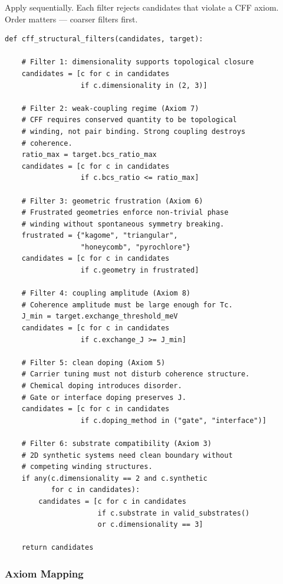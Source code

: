 \documentclass[11pt, a4paper]{article}
\begin{document}
Apply sequentially. Each filter rejects candidates that violate a
CFF axiom. Order matters --- coarser filters first.

\begin{lstlisting}
def cff_structural_filters(candidates, target):

    # Filter 1: dimensionality supports topological closure
    candidates = [c for c in candidates
                  if c.dimensionality in (2, 3)]

    # Filter 2: weak-coupling regime (Axiom 7)
    # CFF requires conserved quantity to be topological
    # winding, not pair binding. Strong coupling destroys
    # coherence.
    ratio_max = target.bcs_ratio_max
    candidates = [c for c in candidates
                  if c.bcs_ratio <= ratio_max]

    # Filter 3: geometric frustration (Axiom 6)
    # Frustrated geometries enforce non-trivial phase
    # winding without spontaneous symmetry breaking.
    frustrated = {"kagome", "triangular",
                  "honeycomb", "pyrochlore"}
    candidates = [c for c in candidates
                  if c.geometry in frustrated]

    # Filter 4: coupling amplitude (Axiom 8)
    # Coherence amplitude must be large enough for Tc.
    J_min = target.exchange_threshold_meV
    candidates = [c for c in candidates
                  if c.exchange_J >= J_min]

    # Filter 5: clean doping (Axiom 5)
    # Carrier tuning must not disturb coherence structure.
    # Chemical doping introduces disorder.
    # Gate or interface doping preserves J.
    candidates = [c for c in candidates
                  if c.doping_method in ("gate", "interface")]

    # Filter 6: substrate compatibility (Axiom 3)
    # 2D synthetic systems need clean boundary without
    # competing winding structures.
    if any(c.dimensionality == 2 and c.synthetic
           for c in candidates):
        candidates = [c for c in candidates
                      if c.substrate in valid_substrates()
                      or c.dimensionality == 3]

    return candidates
\end{lstlisting}

\subsubsection{Axiom Mapping}
\end{document}
